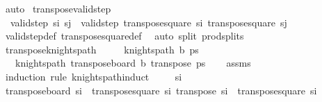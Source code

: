 \begin{isabellebody}
\ auto%
\endisatagproof
{\isafoldproof}%
%
\isadelimproof
\isanewline
%
\endisadelimproof
\isanewline
{}\isamarkupfalse%
\ transpose{\isacharunderscore}{\kern0pt}valid{\isacharunderscore}{\kern0pt}step{\isacharcolon}{\kern0pt}\ \isanewline
\ \ {\isachardoublequoteopen}valid{\isacharunderscore}{\kern0pt}step\ s\isactrlsub i\ s\isactrlsub j\ {\isasymlongleftrightarrow}\ valid{\isacharunderscore}{\kern0pt}step\ {\isacharparenleft}{\kern0pt}transpose{\isacharunderscore}{\kern0pt}square\ s\isactrlsub i{\isacharparenright}{\kern0pt}\ {\isacharparenleft}{\kern0pt}transpose{\isacharunderscore}{\kern0pt}square\ s\isactrlsub j{\isacharparenright}{\kern0pt}{\isachardoublequoteclose}\isanewline
%
\isadelimproof
\ \ %
\endisadelimproof
%
\isatagproof
{}\isamarkupfalse%
\ valid{\isacharunderscore}{\kern0pt}step{\isacharunderscore}{\kern0pt}def\ transpose{\isacharunderscore}{\kern0pt}square{\isacharunderscore}{\kern0pt}def\ \isamarkupfalse%
\ {\isacharparenleft}{\kern0pt}auto\ split{\isacharcolon}{\kern0pt}\ prod{\isachardot}{\kern0pt}splits{\isacharparenright}{\kern0pt}%
\endisatagproof
{\isafoldproof}%
%
\isadelimproof
\isanewline
%
\endisadelimproof
\isanewline
{}\isamarkupfalse%
\ transpose{\isacharunderscore}{\kern0pt}knights{\isacharunderscore}{\kern0pt}path{\isacharprime}{\kern0pt}{\isacharcolon}{\kern0pt}\ \ \isanewline
\ \ \ {\isachardoublequoteopen}knights{\isacharunderscore}{\kern0pt}path\ b\ ps{\isachardoublequoteclose}\ \isanewline
\ \ \ {\isachardoublequoteopen}knights{\isacharunderscore}{\kern0pt}path\ {\isacharparenleft}{\kern0pt}transpose{\isacharunderscore}{\kern0pt}board\ b{\isacharparenright}{\kern0pt}\ {\isacharparenleft}{\kern0pt}transpose\ ps{\isacharparenright}{\kern0pt}{\isachardoublequoteclose}\isanewline
%
\isadelimproof
\ \ %
\endisadelimproof
%
\isatagproof
{}\isamarkupfalse%
\ assms\isanewline
{}\isamarkupfalse%
\ {\isacharparenleft}{\kern0pt}induction\ rule{\isacharcolon}{\kern0pt}\ knights{\isacharunderscore}{\kern0pt}path{\isachardot}{\kern0pt}induct{\isacharparenright}{\kern0pt}\isanewline
\ \ \isamarkupfalse%
\ {\isacharparenleft}{\kern0pt}{}\ s\isactrlsub i{\isacharparenright}{\kern0pt}\isanewline
\ \ \isamarkupfalse%
\ \isamarkupfalse%
\ {\isachardoublequoteopen}transpose{\isacharunderscore}{\kern0pt}board\ {\isacharbraceleft}{\kern0pt}s\isactrlsub i{\isacharbraceright}{\kern0pt}\ {\isacharequal}{\kern0pt}\ {\isacharbraceleft}{\kern0pt}transpose{\isacharunderscore}{\kern0pt}square\ s\isactrlsub i{\isacharbraceright}{\kern0pt}{\isachardoublequoteclose}\ {\isachardoublequoteopen}transpose\ {\isacharbrackleft}{\kern0pt}s\isactrlsub i{\isacharbrackright}{\kern0pt}\ {\isacharequal}{\kern0pt}\ {\isacharbrackleft}{\kern0pt}transpose{\isacharunderscore}{\kern0pt}square\ s\isactrlsub i{\isacharbrackright}{\kern0pt}{\isachardoublequoteclose}\isanewline

\end{isabellebody}

